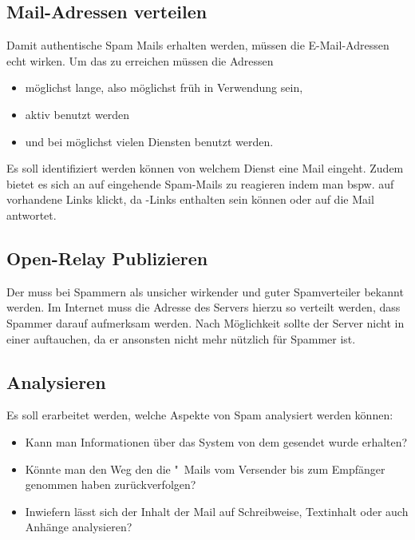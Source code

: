 \documentclass[a4paper,11pt,singlespacing]{article}
\begin{document}
	\subsection{Mail-Adressen verteilen}\label{sec:ProblemstellungMailsVerteilen}
		Damit authentische Spam Mails erhalten werden, müssen die E-Mail-Adressen echt wirken.
		Um das zu erreichen müssen die Adressen
		\begin{itemize}
		\item möglichst lange, also möglichst früh in Verwendung sein,
		\item aktiv benutzt werden
		\item und bei möglichst vielen Diensten benutzt werden.
		\end{itemize}
		Es soll identifiziert werden können von welchem Dienst eine Mail eingeht.
		Zudem bietet es sich an auf eingehende Spam-Mails zu reagieren indem man bspw. auf vorhandene Links klickt, da -Links enthalten sein können oder auf die Mail antwortet.

	\subsection{Open-Relay Publizieren}\label{sec:ProblemstellungPublizieren}
		Der  muss bei Spammern als unsicher wirkender  und guter Spamverteiler bekannt werden.
		Im Internet muss die Adresse des Servers hierzu so verteilt werden, dass Spammer darauf aufmerksam werden.
		Nach Möglichkeit sollte der Server nicht in einer   auftauchen, da er ansonsten nicht mehr nützlich für Spammer ist.

	\subsection{Analysieren}\label{sec:ProblemstellungAnalysieren}
		Es soll erarbeitet werden, welche Aspekte von Spam analysiert werden können:
		\begin{itemize}
		\item Kann man Informationen über das System von dem gesendet wurde erhalten?
		\item Könnte man den Weg den die "~Mails vom Versender bis zum Empfänger genommen haben zurückverfolgen?
		\item Inwiefern lässt sich der Inhalt der Mail auf Schreibweise, Textinhalt oder auch Anhänge analysieren?
		\end{itemize}
\end{document}
